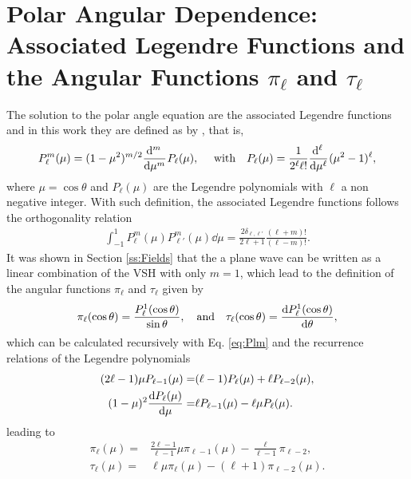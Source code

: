 \section*{Polar Angular Dependence: Associated Legendre Functions and the Angular Functions $\pi_\ell$ and $\tau_\ell$}
The solution to the polar angle equation are the associated Legendre functions and in this work they are defined as by \citeauthor{arfken_mathematical_2001} \cite{arfken_mathematical_2001}, that is,
%
%
%
\begin{equation}
P_\ell^m(\mu) = (1-\mu^2)^{m/2}\dv[m]{\,}{\mu}\hspace*{.05em} P_\ell(\mu),
\qqtext{ with}
P_\ell(\mu) = \frac{1}{2^\ell \ell!}\dv[\ell]{\,}{\mu}\hspace*{.05em}  (\mu^2-1)^\ell ,
\label{eq:Plm}
\end{equation}
%
where $\mu = \cos\theta$ and $P_\ell(\mu)$ are the Legendre polynomials with $\ell$ a non negative integer. With such definition, the  associated Legendre functions follows the orthogonality relation
%
\begin{align}
\int_{-1}^1 P_\ell^m(\mu)P_{\ell'}^m(\mu)\dd{\mu} = \frac{2\delta_{\ell,\ell'}}{2\ell+1}\frac{(\ell+m)!}{(\ell-m)!}.
\label{eq:PlmOrtho}
\end{align}
%
It was shown in Section \ref{ss:Fields} that the a plane wave can be written as a linear combination of the VSH with only $m = 1$, which lead to the definition of the angular functions $\pi_\ell$ and $\tau_\ell$ given by
%
\begin{align*}
 \pi_\ell(\cos\theta )  = \frac{P_\ell^1(\cos\theta)}{\sin\theta},\qqtext{and}
 \tau_\ell(\cos\theta) = \dv{P_\ell^1(\cos\theta)}{\theta},
\end{align*}
%
which can be calculated recursively with Eq. \eqref{eq:Plm}  and the recurrence relations of the Legendre polynomials
%
\begin{align}
(2\ell-1)\mu P_{\ell-1}(\mu) =& (\ell-1) P_{\ell}(\mu) + \ell P_{\ell-2}(\mu),\\
(1-\mu)^2\dv{P_\ell(\mu)}{\mu} =& \ell P_{\ell-1}(\mu) - \ell\mu P_\ell(\mu).
\end{align}
%
leading to
%
\begin{align}
\pi_\ell(\mu) =& \frac{2\ell-1}{\ell-1}\mu \pi_{\ell-1}(\mu) - \frac{\ell}{\ell-1}\pi_{\ell-2},\\
\tau_ \ell (\mu) =& \ell\mu\pi_\ell(\mu) - (\ell+1)\pi_{\ell-2}(\mu).
\end{align}
